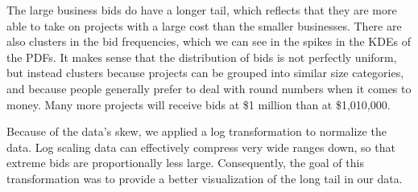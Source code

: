 The large business bids do have a longer tail, which reflects that
they are more able to take on projects with a large cost than
the smaller businesses.
There are also clusters in the bid frequencies, which we can see in
the spikes in the KDEs of the PDFs. It makes sense that the distribution
of bids is not perfectly uniform, but instead clusters because projects
can be grouped into similar size categories, and because people generally prefer
to deal with round numbers when it comes to money.
Many more projects will receive bids at \$1 million than at
\$1,010,000.

Because of the data's skew, we applied a log transformation to
normalize the data. Log scaling data can effectively compress
very wide ranges down, so that extreme bids are proportionally less
large. Consequently, the goal of this transformation was to
provide a better visualization of the long tail in our data.
